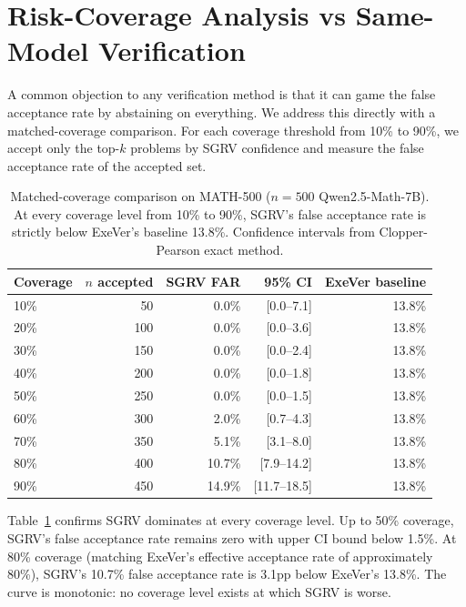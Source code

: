 \documentclass{article}
\begin{document}
\section{Risk-Coverage Analysis vs Same-Model Verification}
\label{sec:riskcov}

A common objection to any verification method is that it can game the false acceptance rate by abstaining on everything. We address this directly with a matched-coverage comparison. For each coverage threshold from 10\% to 90\%, we accept only the top-$k$ problems by SGRV confidence and measure the false acceptance rate of the accepted set.

\begin{table}[t]
\centering
\caption{Matched-coverage comparison on MATH-500 ($n=500$ Qwen2.5-Math-7B). At every coverage level from 10\% to 90\%, SGRV's false acceptance rate is strictly below ExeVer's baseline 13.8\%. Confidence intervals from Clopper-Pearson exact method.}
\label{tab:riskcov_matched}
\small
\begin{tabular}{lrrrr}
\toprule
Coverage & $n$ accepted & SGRV FAR & 95\% CI & ExeVer baseline \\
\midrule
10\% & 50 & 0.0\% & [0.0--7.1] & 13.8\% \\
20\% & 100 & 0.0\% & [0.0--3.6] & 13.8\% \\
30\% & 150 & 0.0\% & [0.0--2.4] & 13.8\% \\
40\% & 200 & 0.0\% & [0.0--1.8] & 13.8\% \\
50\% & 250 & 0.0\% & [0.0--1.5] & 13.8\% \\
60\% & 300 & 2.0\% & [0.7--4.3] & 13.8\% \\
70\% & 350 & 5.1\% & [3.1--8.0] & 13.8\% \\
80\% & 400 & 10.7\% & [7.9--14.2] & 13.8\% \\
90\% & 450 & 14.9\% & [11.7--18.5] & 13.8\% \\
\bottomrule
\end{tabular}
\end{table}

Table~\ref{tab:riskcov_matched} confirms SGRV dominates at every coverage level. Up to 50\% coverage, SGRV's false acceptance rate remains zero with upper CI bound below 1.5\%. At 80\% coverage (matching ExeVer's effective acceptance rate of approximately 80\%), SGRV's 10.7\% false acceptance rate is 3.1pp below ExeVer's 13.8\%. The curve is monotonic: no coverage level exists at which SGRV is worse.
\end{document}
